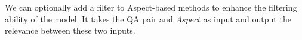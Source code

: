 


We can optionally add a filter to Aspect-based methods to enhance the filtering ability of the model.
It takes the QA pair and $Aspect$ as input and output the relevance between these two inputs.


